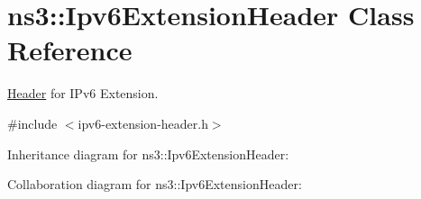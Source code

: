 \hypertarget{classns3_1_1Ipv6ExtensionHeader}{}\section{ns3\+:\+:Ipv6\+Extension\+Header Class Reference}
\label{classns3_1_1Ipv6ExtensionHeader}


\hyperlink{classns3_1_1Header}{Header} for I\+Pv6 Extension.  




{\ttfamily \#include $<$ipv6-\/extension-\/header.\+h$>$}



Inheritance diagram for ns3\+:\+:Ipv6\+Extension\+Header\+:


Collaboration diagram for ns3\+:\+:Ipv6\+Extension\+Header\+:
